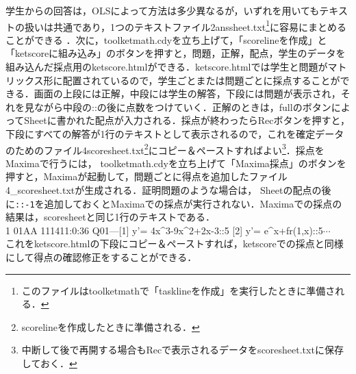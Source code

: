 \documentclass[a4j,12pt]{ujarticle}
\begin{document}
学生からの回答は，OLSによって方法は多少異なるが，いずれを用いてもテキストの扱いは共通であり，1つのテキストファイル2anssheet.txt\footnote{このファイルはtoolketmathで「tasklineを作成」を実行したときに準備される．}に容易にまとめることができる ．次に，toolketmath.cdyを立ち上げて，「scorelineを作成」と「ketscoreに組み込み」のボタンを押すと，問題，正解，配点，学生のデータを組み込んだ採点用のketscore.htmlができる．ketscore.htmlでは学生と問題がマトリックス形に配置されているので，学生ごとまたは問題ごとに採点することができる．画面の上段には正解，中段には学生の解答，下段には問題が表示され，それを見ながら中段の::の後に点数をつけていく．正解のときは，fullのボタンによってSheetに書かれた配点が入力される．採点が終わったらRecボタンを押すと，下段にすべての解答が1行のテキストとして表示されるので，これを確定データのためのファイル4scoresheet.txt\footnote{scorelineを作成したときに準備される．}にコピー＆ペーストすればよい\footnote{中断して後で再開する場合もRecで表示されるデータをscoresheet.txtに保存しておく．}．採点をMaximaで行うには，
toolketmath.cdyを立ち上げて「Maxima採点」のボタンを押すと，Maximaが起動して，問題ごとに得点を追加したファイル%
4\_scoresheet.txtが生成される．証明問題のような場合は，
Sheetの配点の後に\verb|::-1|を追加しておくとMaximaでの採点が実行されない．Maximaでの採点の結果は，scoresheetと同じ1行のテキストである．\\
\hspace*{2zw}%
1 01AA 111411:0:36 Q01---[1] y'=  4x\^{}3-9x\^{}2+2x-3::5 [2] y'=  e\^{}x+fr(1,x)::5$\cdots$\\
これをketscore.htmlの下段にコピー＆ペーストすれば，ketscoreでの採点と同様にして得点の確認修正をすることができる．
\end{document}
